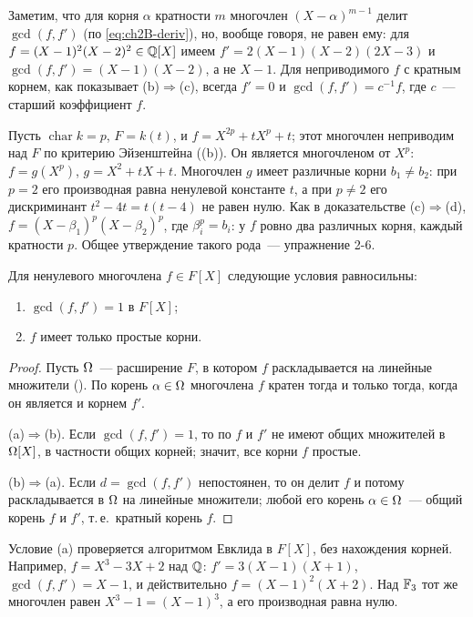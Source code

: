 Заметим, что для корня $\alpha$ кратности $m$ многочлен $(X-\alpha)^{m-1}$ делит $\gcd(f,f')$ (по
\eqref{eq:ch2B-deriv}), но, вообще говоря, не равен ему: для $f=(X-1)^2(X-2)^2\in\mathbb Q[X]$ имеем $f'=2(X-1)(X-2)(2X-3)$ и
$\gcd(f,f')=(X-1)(X-2)$, а не $X-1$. Для неприводимого $f$ с кратным корнем, как показывает (b)$\Rightarrow$(c), всегда
$f'=0$ и $\gcd(f,f')=c^{-1}f$, где $c$~--- старший коэффициент $f$.

\begin{example}[2.20a]
Пусть $\operatorname{char}k=p$, $F=k(t)$, и $f=X^{2p}+tX^p+t$; этот многочлен неприводим над $F$ по критерию Эйзенштейна
((b)). Он является многочленом от $X^p$: $f=g(X^p)$, $g=X^2+tX+t$. Многочлен $g$ имеет различные корни $b_1\ne
b_2$: при $p=2$ его производная равна ненулевой константе $t$, а при $p\ne2$ его дискриминант $t^2-4t=t(t-4)$ не равен
нулю. Как в доказательстве (c)$\Rightarrow$(d), $f=(X-\beta_1)^p(X-\beta_2)^p$, где $\beta_i^p=b_i$: у $f$ ровно два
различных корня, каждый кратности $p$. Общее утверждение такого рода~--- упражнение 2-6.
\end{example}

\begin{proposition}[2.21]
Для ненулевого многочлена $f\in F[X]$ следующие условия равносильны:
\begin{enumerate}[label=(\alph*)]
\item $\gcd(f,f')=1$ в $F[X]$;
\item $f$ имеет только простые корни.
\end{enumerate}
\end{proposition}

\begin{proof}
Пусть $\Omega$~--- расширение $F$, в котором $f$ раскладывается на линейные множители (). По  корень $\alpha\in\Omega$
многочлена $f$ кратен тогда и только тогда, когда он является и корнем $f'$.

(a)$\Rightarrow$(b). Если $\gcd(f,f')=1$, то по  $f$ и $f'$ не имеют общих множителей в $\Omega[X]$, в частности
общих корней; значит, все корни $f$ простые.

(b)$\Rightarrow$(a). Если $d=\gcd(f,f')$ непостоянен, то он делит $f$ и потому раскладывается в $\Omega$ на линейные
множители; любой его корень $\alpha\in\Omega$~--- общий корень $f$ и $f'$, т.\,е.\ кратный корень $f$.
\end{proof}

Условие (a) проверяется алгоритмом Евклида в $F[X]$, без нахождения корней. Например, $f=X^3-3X+2$ над $\mathbb Q$:
$f'=3(X-1)(X+1)$, $\gcd(f,f')=X-1$, и действительно $f=(X-1)^2(X+2)$. Над $\mathbb F_3$ тот же многочлен равен $X^3-1=(X-1)^3$, а
его производная равна нулю.

